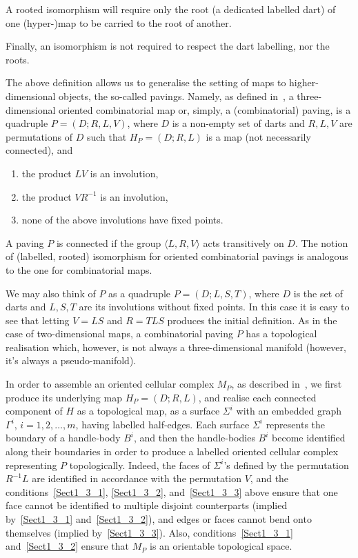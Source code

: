 \documentclass[ALCO,ThmDefs,Unicode,epreuves]{cedram}
\begin{document}
A rooted isomorphism will require only the root (a dedicated labelled dart) of one (hyper-)map to be carried to the root of another. 

Finally, an isomorphism is not required to respect the dart labelling, nor the roots. 

The above definition allows us to generalise the setting of maps to higher-dimensional objects, the so-called pavings. Namely, as defined in~\cite{AK}, a three-dimensional oriented combinatorial map or, simply, a (combinatorial) paving, is a quadruple $P = ( D; R, L, V )$, where $D$ is a non-empty set of darts and $R, L, V$ are permutations of $D$ such that $H_P = ( D; R, L )$ is a map (not necessarily connected), and

\begin{enumerate}
\item\label{Sect1_3_1} %
the product $L V$ is an involution,
\item\label{Sect1_3_2} %
the product $V R^{-1}$ is an involution,
\item\label{Sect1_3_3} %
none of the above involutions have fixed points.
\end{enumerate}

A paving $P$ is connected if the group $\langle L, R, V \rangle$ acts transitively on $D$. The notion of (labelled, rooted) isomorphism for oriented combinatorial pavings is analogous to the one for combinatorial maps. 

We may also think of $P$ as a quadruple $P = ( D; L, S, T )$, where $D$ is the set of darts and $L, S, T$ are its involutions without fixed points. In this case it is easy to see that letting $V = L S$ and $R = T L S $ produces the initial definition. As in the case of two-dimensional maps, a combinatorial paving $P$ has a topological realisation which, however, is not always a three-dimensional manifold (however, it's always a pseudo-manifold).

In order to assemble an oriented cellular complex $M_P$, as described in~\cite{Spehner}, we first produce its underlying map $H_P = ( D; R, L )$, and realise each connected component of $H$ as a topological map, \ie as a surface $\Sigma^i$ with an embedded graph $\Gamma^i$, $i=1, 2, \dots, m$, having labelled half-edges. Each surface $\Sigma^i$ represents the boundary of a handle-body $B^i$, and then the handle-bodies $B^i$ become identified along their boundaries in order to produce a labelled oriented cellular complex representing $P$ topologically. Indeed, the faces of $\Sigma^i$'s defined by the permutation $R^{-1} L$ are identified in accordance with the permutation $V$, and the conditions~\eqref{Sect1_3_1}, \eqref{Sect1_3_2}, and~\eqref{Sect1_3_3} above ensure that one face cannot be identified to multiple disjoint counterparts (implied by~\eqref{Sect1_3_1} and~\eqref{Sect1_3_2}), and edges or faces cannot bend onto themselves (implied by~\eqref{Sect1_3_3}). Also, conditions~\eqref{Sect1_3_1} and~\eqref{Sect1_3_2} ensure that $M_P$ is an orientable topological space.
\end{document}
